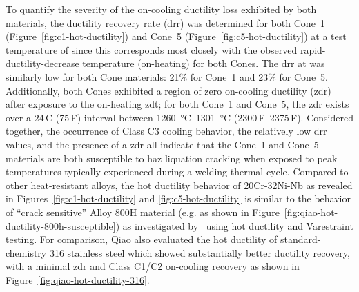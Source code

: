 {To quantify the severity of the on-cooling ductility loss exhibited by both materials, the ductility recovery rate (\gls{drr}) was determined for both Cone~1 (Figure~\ref{fig:c1-hot-ductility}) and Cone~5 (Figure~\ref{fig:c5-hot-ductility}) at a test temperature of  since this corresponds most closely with the observed rapid-ductility-decrease temperature (on-heating) for both Cones.  The \gls{drr} at  was similarly low for both Cone materials: 21\% for Cone~1 and 23\% for Cone~5.  Additionally, both Cones exhibited a region of zero on-cooling ductility (\gls{zdr}) after exposure to the on-heating \gls{zdt}; for both Cone~1 and Cone~5, the \gls{zdr} exists over a 24\,C\textdegree{} (75\,F\textdegree{}) interval between \SIrange[range-phrase=--]{1260}{1301}{\degreeCelsius} (2300\,\textdegree{}F--2375\,\textdegree{}F).  Considered together, the occurrence of Class C3 cooling behavior, the relatively low \gls{drr} values, and the presence of a \gls{zdr} all indicate that the Cone~1 and Cone~5 materials are both susceptible to \gls{haz} liquation cracking when exposed to peak temperatures typically experienced during a welding thermal cycle. Compared to other heat-resistant alloys, the hot ductility behavior of 20Cr-32Ni-Nb as revealed in Figures~\ref{fig:c1-hot-ductility} and \ref{fig:c5-hot-ductility} is similar to the behavior of ``crack sensitive'' Alloy 800H material (e.g. as shown in Figure~\ref{fig:qiao-hot-ductility-800h-susceptible}) as investigated by~\citet{qiao_weldability_1993} using hot ductility and Varestraint testing. For comparison, Qiao also evaluated the hot ductility of standard-chemistry 316 stainless steel which showed substantially better ductility recovery, with a minimal \gls{zdr} and Class C1/C2 on-cooling recovery as shown in Figure~\ref{fig:qiao-hot-ductility-316}.

}
